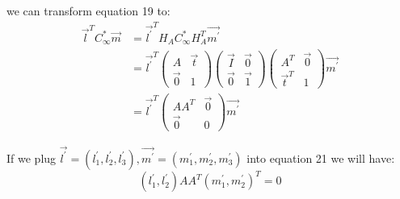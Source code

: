 \documentclass[conference]{IEEEtran}
\let\oldvec\vec
\renewcommand{\vec}[1]{\oldvec{\mathit{#1}}}
\begin{document}
\noindent we can transform equation 19 to:
\begin{equation}
	\begin{split}
		\vec{l}^T C^*_{\infty} \vec{m} &= \vec{l^\prime}^TH_{A}C_{\infty}^*H_A^T\vec{m^\prime}\\
		&= \vec{l^\prime}^T
		\begin{pmatrix}
			A & \vec{t}\\
			\vec{0} & 1
		\end{pmatrix}
		\begin{pmatrix}
			\vec{I} & \vec{0}\\
			\vec{0} & \vec{1}
		\end{pmatrix}
		\begin{pmatrix}
			A^T & \vec{0}\\
			\vec{t}^T & 1
		\end{pmatrix}
		\vec{m^\prime}\\
		& = \vec{l^\prime}^T
		\begin{pmatrix}
			AA^T & \vec{0}\\
			\vec{0} & 0
		\end{pmatrix}
		\vec{m^\prime}
	\end{split}
\end{equation}


\noindent If we plug $\vec{l^\prime} = (l_1^\prime, l_2^\prime, l_3^\prime), \vec{m^\prime} = (m_1^\prime, m_2^\prime, m_3^\prime)$ into equation 21 we will have:
\begin{equation}
	(l_1^\prime, l_2^\prime)AA^T(m_1^\prime, m_2^\prime)^T = 0
\end{equation}











%
%
%






\end{document}
